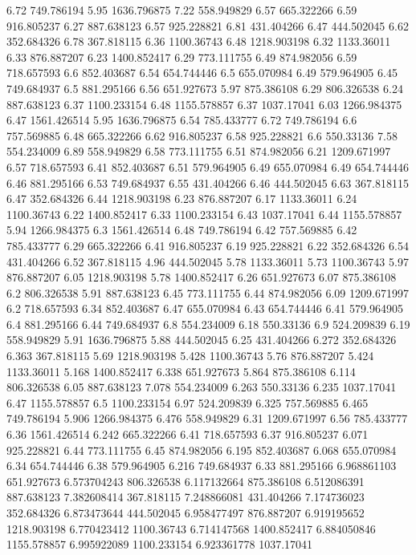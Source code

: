 6.72	749.786194
5.95	1636.796875
7.22	558.949829
6.57	665.322266
6.59	916.805237
6.27	887.638123
6.57	925.228821
6.81	431.404266
6.47	444.502045
6.62	352.684326
6.78	367.818115
6.36	1100.36743
6.48	1218.903198
6.32	1133.36011
6.33	876.887207
6.23	1400.852417
6.29	773.111755
6.49	874.982056
6.59	718.657593
6.6	852.403687
6.54	654.744446
6.5	655.070984
6.49	579.964905
6.45	749.684937
6.5	881.295166
6.56	651.927673
5.97	875.386108
6.29	806.326538
6.24	887.638123
6.37	1100.233154
6.48	1155.578857
6.37	1037.17041
6.03	1266.984375
6.47	1561.426514
5.95	1636.796875
6.54	785.433777
6.72	749.786194
6.6	757.569885
6.48	665.322266
6.62	916.805237
6.58	925.228821
6.6	550.33136
7.58	554.234009
6.89	558.949829
6.58	773.111755
6.51	874.982056
6.21	1209.671997
6.57	718.657593
6.41	852.403687
6.51	579.964905
6.49	655.070984
6.49	654.744446
6.46	881.295166
6.53	749.684937
6.55	431.404266
6.46	444.502045
6.63	367.818115
6.47	352.684326
6.44	1218.903198
6.23	876.887207
6.17	1133.36011
6.24	1100.36743
6.22	1400.852417
6.33	1100.233154
6.43	1037.17041
6.44	1155.578857
5.94	1266.984375
6.3	1561.426514
6.48	749.786194
6.42	757.569885
6.42	785.433777
6.29	665.322266
6.41	916.805237
6.19	925.228821
6.22	352.684326
6.54	431.404266
6.52	367.818115
4.96	444.502045
5.78	1133.36011
5.73	1100.36743
5.97	876.887207
6.05	1218.903198
5.78	1400.852417
6.26	651.927673
6.07	875.386108
6.2	806.326538
5.91	887.638123
6.45	773.111755
6.44	874.982056
6.09	1209.671997
6.2	718.657593
6.34	852.403687
6.47	655.070984
6.43	654.744446
6.41	579.964905
6.4	881.295166
6.44	749.684937
6.8	554.234009
6.18	550.33136
6.9	524.209839
6.19	558.949829
5.91	1636.796875
5.88	444.502045
6.25	431.404266
6.272	352.684326
6.363	367.818115
5.69	1218.903198
5.428	1100.36743
5.76	876.887207
5.424	1133.36011
5.168	1400.852417
6.338	651.927673
5.864	875.386108
6.114	806.326538
6.05	887.638123
7.078	554.234009
6.263	550.33136
6.235	1037.17041
6.47	1155.578857
6.5	1100.233154
6.97	524.209839
6.325	757.569885
6.465	749.786194
5.906	1266.984375
6.476	558.949829
6.31	1209.671997
6.56	785.433777
6.36	1561.426514
6.242	665.322266
6.41	718.657593
6.37	916.805237
6.071	925.228821
6.44	773.111755
6.45	874.982056
6.195	852.403687
6.068	655.070984
6.34	654.744446
6.38	579.964905
6.216	749.684937
6.33	881.295166
6.968861103	651.927673
6.573704243	806.326538
6.117132664	875.386108
6.512086391	887.638123
7.382608414	 367.818115
7.248866081	 431.404266
7.174736023 352.684326
6.873473644	444.502045
6.958477497	876.887207
6.919195652	1218.903198
6.770423412	1100.36743
6.714147568	1400.852417
6.884050846	1155.578857
6.995922089	1100.233154
6.923361778	1037.17041
